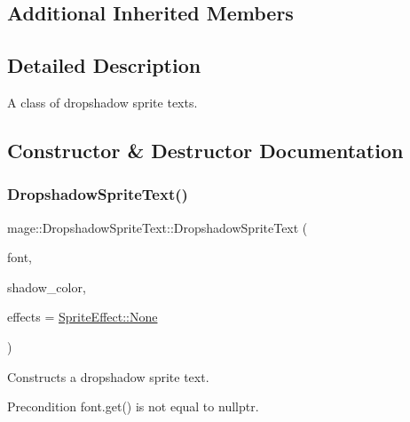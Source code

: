 \subsection*{Additional Inherited Members}


\subsection{Detailed Description}
A class of dropshadow sprite texts. 

\subsection{Constructor \& Destructor Documentation}
\hypertarget{classmage_1_1_dropshadow_sprite_text_af9580cd770e5dad0b3d5a9299c0a7522}{}\label{classmage_1_1_dropshadow_sprite_text_af9580cd770e5dad0b3d5a9299c0a7522} 
\subsubsection{\texorpdfstring{Dropshadow\+Sprite\+Text()}{DropshadowSpriteText()}\hspace{0.1cm}{\footnotesize\ttfamily [1/4]}}
{\footnotesize\ttfamily mage\+::\+Dropshadow\+Sprite\+Text\+::\+Dropshadow\+Sprite\+Text (\begin{DoxyParamCaption}\item[{\hyperlink{namespacemage_a1e01ae66713838a7a67d30e44c67703e}{Shared\+Ptr}$<$ \hyperlink{classmage_1_1_sprite_font}{Sprite\+Font} $>$}]{font,  }\item[{const \hyperlink{structmage_1_1_color}{Color} \&}]{shadow\+\_\+color,  }\item[{\hyperlink{namespacemage_a9cfe18123066ba4236f548f9de75d881}{Sprite\+Effect}}]{effects = {\ttfamily \hyperlink{namespacemage_a9cfe18123066ba4236f548f9de75d881a6adf97f83acf6453d4a6a4b1070f3754}{Sprite\+Effect\+::\+None}} }\end{DoxyParamCaption})\hspace{0.3cm}{\ttfamily [explicit]}}

Constructs a dropshadow sprite text.

\begin{DoxyPrecond}{Precondition}
{\ttfamily font.\+get()} is not equal to {\ttfamily nullptr}. 
\end{DoxyPrecond}

